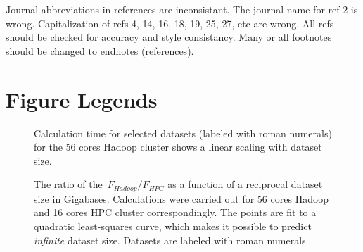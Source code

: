 \documentclass[10pt]{article}
\newcommand{\COMMENT}[1]{{\color{red} #1 }}
\begin{document}
\COMMENT{Journal abbreviations in references are inconsistant. The journal name for ref 2 is wrong. Capitalization of refs 4, 14, 16, 18, 19, 25, 27, etc are wrong. All refs should be checked for accuracy and style consistancy. Many or all footnotes should be changed to endnotes (references).}





\section*{Figure Legends}

\begin{figure}[!ht]
	
	\caption{Calculation time for selected datasets (labeled with roman numerals) for the 56 cores Hadoop cluster shows a linear scaling with dataset size. }
	\label{fig:fig1}
\end{figure}


\begin{figure}[!ht]
	
	\caption{The ratio of the~$F_{Hadoop}/F_{HPC}$ as a function of a reciprocal dataset size in Gigabases. Calculations were carried out for 56 cores Hadoop and 16 cores HPC cluster correspondingly.
The points are fit to a quadratic least-squares curve, which makes it possible to predict {\it infinite} dataset size. Datasets are labeled with roman numerals.}
	\label{fig:fig2}
\end{figure}
\end{document}
